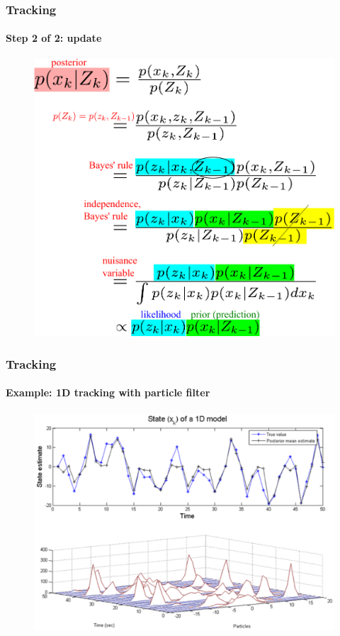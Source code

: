 \begin{frame}
\frametitle{Tracking}
\framesubtitle{Step 2 of 2: update}
\mypagenum{}
\begin{figure}
\includegraphics[height=0.8\textheight]{thesis/TRK_EQN_update.pdf}
\end{figure}
\end{frame}


\begin{frame}
\frametitle{Tracking}
\framesubtitle{Example: 1D tracking with particle filter}
\mypagenum{}
\begin{figure}
\includegraphics[width=1.0\textwidth]{thesis/TRK_ParticleFilter_multimodalPDF.pdf}
\end{figure}	
\end{frame}



